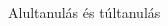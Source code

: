 \documentclass[english, aspectratio=169]{beamer}
\begin{document}
\begin{frame}{Alultanulás és túltanulás}
\begin{columns}
\begin{column}{.5\textwidth}
{\begin{center}
\end{center}}
\end{column}
\end{columns}
\end{frame}
\end{document}
